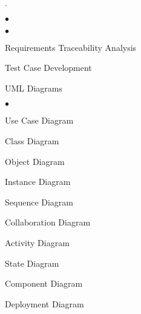 \documentclass[11pt]{article}
\begin{document}
{\begin{list}{.}
\begin{list}{$\bullet$}{\itemsep 0.01in \parskip 0in \parsep 0in}
\begin{list}{$\bullet$}{\itemsep 0.01in \parskip 0in \parsep 0in}
            \end{list}


        \item Requirements Traceability Analysis


        \item Test Case Development

    \end{list}

\item UML Diagrams

    \begin{list}{$\bullet$}{\itemsep 0.01in \parskip 0in \parsep 0in}

        \item Use Case Diagram

        \item Class Diagram

        \item Object Diagram

        \item Instance Diagram

        \item Sequence Diagram

        \item Collaboration Diagram

        \item Activity Diagram

        \item State Diagram

        \item Component Diagram

        \item Deployment Diagram

    \end{list}



\end{list}


\begin{comment}

\section{OO Analysis and Design Concept Inventory}


\begin{list}{\arabic{mycount}.}%
{\usecounter{mycount}\itemsep 0.01in \parskip 0in \parsep 0in}


    \item Business Modeling


\end{comment}}
\end{document}
